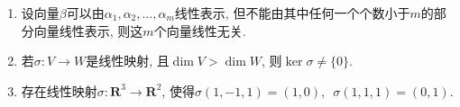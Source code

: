 \begin{enumerate}
\begin{enumerate}
              \item 设向量\(\beta\)可以由\(\alpha_1,\alpha_2,\ldots,\alpha_{m}\)线性表示, 但不能由其中任何一个个数小于\(m\)的部分向量线性表示, 则这\(m\)个向量线性无关.

              \item 若\(\sigma\colon V \to W\)是线性映射, 且\(\dim V > \dim W\), 则\(\ker\sigma \neq \{ 0 \}\).

              \item 存在线性映射\(\sigma\colon \mathbf{R}^3 \to \mathbf{R}^2\), 使得\(\sigma(1, - 1,1) = (1,0),\enspace \sigma(1,1,1) = (0,1)\).
          \end{enumerate}
\end{enumerate}

\clearpage
